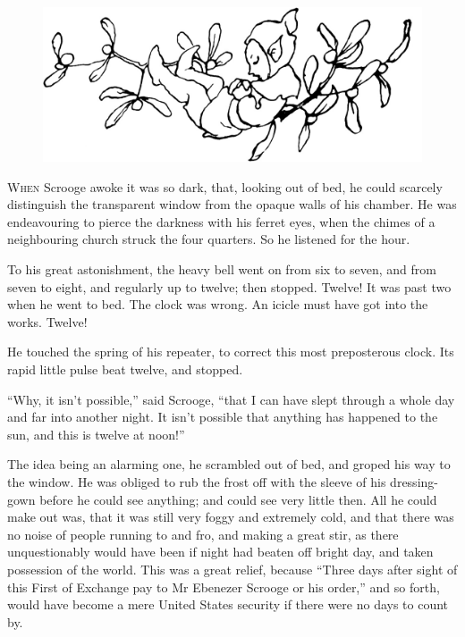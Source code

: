 \documentclass[paper=5.5in:8.5in,BCOR=7mm,twoside,DIV=calc,12pt,usegeometry]{scrbook} %
\begin{document}
\begin{figure}[h]
\centering
\includegraphics[width=.9\linewidth]{sleepelf}
\end{figure}

\lettrine[loversize=.85]{W}{hen} Scrooge awoke it was so dark, that, looking out of bed, he could scarcely distinguish the transparent window from the opaque walls of his chamber. He was endeavouring to pierce the darkness with his ferret eyes, when the chimes of a neighbouring church struck the four quarters. So he listened for the hour.

To his great astonishment, the heavy bell went on from six to seven, and from seven to eight, and regularly up to twelve; then stopped. Twelve! It was past two when he went to bed. The clock was wrong. An icicle must have got into the works. Twelve!

He touched the spring of his repeater, to correct this most preposterous clock. Its rapid little pulse beat twelve, and stopped.

\enquote{Why, it isn't possible,} said Scrooge, \enquote{that I can have slept \newline through a whole day and far into another night. It isn't possible that anything has happened to the sun, and this is twelve at noon!}

The idea being an alarming one, he scrambled out of bed, and groped his way to the window. He was obliged to rub the frost off with the sleeve of his dressing-gown before he could see anything; and could see very little then. All he could make out was, that it was still very foggy and extremely cold, and that there was no noise of people running to and fro, and making a great stir, as there unquestionably would have been if night had beaten off bright day, and taken possession of the world. This was a great relief, because \enquote{Three days after sight of this First of Exchange pay to Mr Ebenezer Scrooge or his order,} and so forth, would have become a mere United States security if there were no days to count by.
\end{document}
